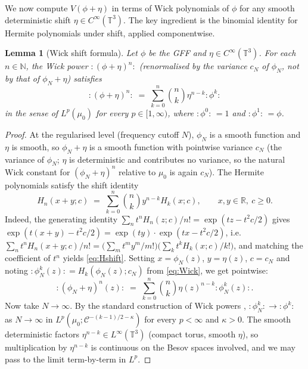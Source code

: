 \documentclass[12pt]{article}
\newtheorem{lemma}[theorem]{Lemma}
\theoremstyle{definition}
\begin{document}
We now compute $V(\phi+\eta)$ in terms of Wick polynomials of $\phi$ for any smooth
deterministic shift $\eta\in C^\infty(\mathbb{T}^3)$. The key ingredient is the binomial
identity for Hermite polynomials under shift, applied componentwise.

\begin{lemma}[Wick shift formula]\label{lem:Wickshift}
Let $\phi$ be the GFF and $\eta\in C^\infty(\mathbb{T}^3)$. For each $n\in\mathbb{N}$, the
Wick power $\colon\!(\phi+\eta)^n\!\colon$ (renormalised by the variance $c_N$ of $\phi_N$,
not by that of $\phi_N+\eta$) satisfies
\begin{equation}\label{eq:Wickbin}
\colon\!(\phi+\eta)^n\!\colon \;=\; \sum_{k=0}^n\binom{n}{k}\eta^{n-k}\colon\!\phi^k\!\colon
\end{equation}
in the sense of $L^p(\mu_0)$ for every $p\in[1,\infty)$, where
$\colon\!\phi^0\!\colon\,=1$ and $\colon\!\phi^1\!\colon\,=\phi$.
\end{lemma}

\begin{proof}
At the regularised level (frequency cutoff $N$), $\phi_N$ is a smooth function and $\eta$ is
smooth, so $\phi_N+\eta$ is a smooth function with pointwise variance $c_N$ (the variance
of $\phi_N$; $\eta$ is deterministic and contributes no variance, so the natural Wick
constant for $(\phi_N+\eta)^n$ relative to $\mu_0$ is again $c_N$). The Hermite polynomials
satisfy the shift identity
\begin{equation}\label{eq:Hshift}
H_n(x+y;c) \;=\; \sum_{k=0}^n\binom{n}{k}y^{n-k}H_k(x;c),\qquad x,y\in\mathbb{R},\ c\ge 0.
\end{equation}
Indeed, the generating identity $\sum_n t^n H_n(z;c)/n!=\exp(tz-t^2c/2)$ gives
$\exp(t(x+y)-t^2c/2)=\exp(ty)\cdot\exp(tx-t^2c/2)$, i.e.
$\sum_n t^n H_n(x+y;c)/n!=\bigl(\sum_m t^m y^m/m!\bigr)\bigl(\sum_k t^k H_k(x;c)/k!\bigr)$,
and matching the coefficient of $t^n$ yields \eqref{eq:Hshift}. Setting
$x=\phi_N(z)$, $y=\eta(z)$, $c=c_N$ and noting $\colon\!\phi_N^k(z)\!\colon=H_k(\phi_N(z);c_N)$
from \eqref{eq:Wick}, we get pointwise:
\[
\colon\!(\phi_N+\eta)^n(z)\!\colon \;=\; \sum_{k=0}^n\binom{n}{k}\eta(z)^{n-k}\colon\!\phi_N^k(z)\!\colon.
\]
Now take $N\to\infty$. By the standard construction of Wick powers \cite[Ch.~I, \S3]{Simon},
$\colon\!\phi_N^k\!\colon\to\colon\!\phi^k\!\colon$ as $N\to\infty$ in
$L^p(\mu_0;\mathcal{C}^{-(k-1)/2-\kappa})$ for every $p<\infty$ and $\kappa>0$. The smooth
deterministic factors $\eta^{n-k}\in L^\infty(\mathbb{T}^3)$ (compact torus, smooth $\eta$),
so multiplication by $\eta^{n-k}$ is continuous on the Besov spaces involved, and we may
pass to the limit term-by-term in $L^p$.
\end{proof}
\end{document}
